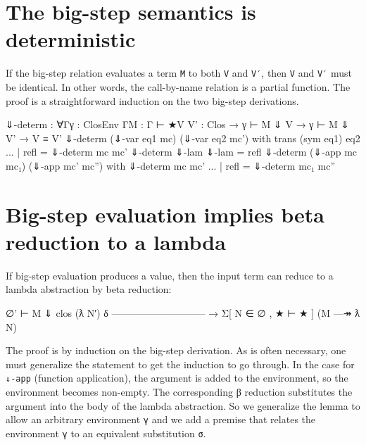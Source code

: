 \hypertarget{the-big-step-semantics-is-deterministic}{%
\section{The big-step semantics is
deterministic}\label{the-big-step-semantics-is-deterministic}}

If the big-step relation evaluates a term \texttt{M} to both \texttt{V}
and \texttt{V′}, then \texttt{V} and \texttt{V′} must be identical. In
other words, the call-by-name relation is a partial function. The proof
is a straightforward induction on the two big-step derivations.

\begin{fence}
\begin{code}
⇓-determ : ∀{Γ}{γ : ClosEnv Γ}{M : Γ ⊢ ★}{V V' : Clos}
  → γ ⊢ M ⇓ V → γ ⊢ M ⇓ V'
  → V ≡ V'
⇓-determ (⇓-var eq1 mc) (⇓-var eq2 mc')
    with trans (sym eq1) eq2
... | refl = ⇓-determ mc mc'
⇓-determ ⇓-lam ⇓-lam = refl
⇓-determ (⇓-app mc mc₁) (⇓-app mc' mc'')
    with ⇓-determ mc mc'
... | refl = ⇓-determ mc₁ mc''
\end{code}
\end{fence}

\hypertarget{big-step-evaluation-implies-beta-reduction-to-a-lambda}{%
\section{Big-step evaluation implies beta reduction to a
lambda}\label{big-step-evaluation-implies-beta-reduction-to-a-lambda}}

If big-step evaluation produces a value, then the input term can reduce
to a lambda abstraction by beta reduction:

\begin{myDisplay}
  ∅' ⊢ M ⇓ clos (ƛ N′) δ
  -----------------------------
→ Σ[ N ∈ ∅ , ★ ⊢ ★ ] (M —↠ ƛ N)
\end{myDisplay}

The proof is by induction on the big-step derivation. As is often
necessary, one must generalize the statement to get the induction to go
through. In the case for \texttt{⇓-app} (function application), the
argument is added to the environment, so the environment becomes
non-empty. The corresponding β reduction substitutes the argument into
the body of the lambda abstraction. So we generalize the lemma to allow
an arbitrary environment \texttt{γ} and we add a premise that relates
the environment \texttt{γ} to an equivalent substitution \texttt{σ}.


